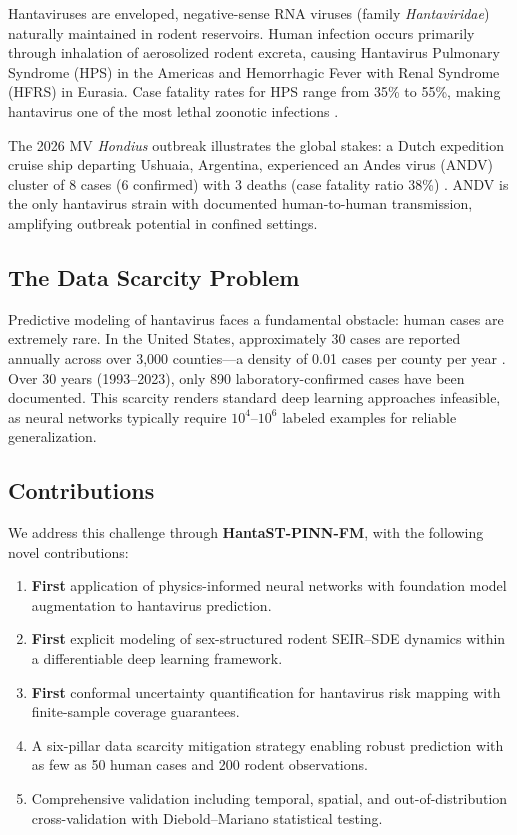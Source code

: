 \documentclass[11pt,a4paper]{article}
\begin{document}
Hantaviruses are enveloped, negative-sense RNA viruses (family \textit{Hantaviridae}) naturally maintained in rodent reservoirs. Human infection occurs primarily through inhalation of aerosolized rodent excreta, causing Hantavirus Pulmonary Syndrome (HPS) in the Americas and Hemorrhagic Fever with Renal Syndrome (HFRS) in Eurasia. Case fatality rates for HPS range from 35\% to 55\%, making hantavirus one of the most lethal zoonotic infections \citep{cdc2023hanta,who2026don600}.

The 2026 MV \textit{Hondius} outbreak illustrates the global stakes: a Dutch expedition cruise ship departing Ushuaia, Argentina, experienced an Andes virus (ANDV) cluster of 8 cases (6 confirmed) with 3 deaths (case fatality ratio 38\%) \citep{who2026don600,cdc2026han528}. ANDV is the only hantavirus strain with documented human-to-human transmission, amplifying outbreak potential in confined settings.

\subsection{The Data Scarcity Problem}

Predictive modeling of hantavirus faces a fundamental obstacle: human cases are extremely rare. In the United States, approximately 30 cases are reported annually across over 3,000 counties---a density of 0.01 cases per county per year \citep{cdc2023surveillance}. Over 30 years (1993--2023), only 890 laboratory-confirmed cases have been documented. This scarcity renders standard deep learning approaches infeasible, as neural networks typically require $10^4$--$10^6$ labeled examples for reliable generalization.

\subsection{Contributions}

We address this challenge through \textbf{HantaST-PINN-FM}, with the following novel contributions:

\begin{enumerate}
    \item \textbf{First} application of physics-informed neural networks with foundation model augmentation to hantavirus prediction.
    \item \textbf{First} explicit modeling of sex-structured rodent SEIR--SDE dynamics within a differentiable deep learning framework.
    \item \textbf{First} conformal uncertainty quantification for hantavirus risk mapping with finite-sample coverage guarantees.
    \item A six-pillar data scarcity mitigation strategy enabling robust prediction with as few as 50 human cases and 200 rodent observations.
    \item Comprehensive validation including temporal, spatial, and out-of-distribution cross-validation with Diebold--Mariano statistical testing.
\end{enumerate}
\end{document}
